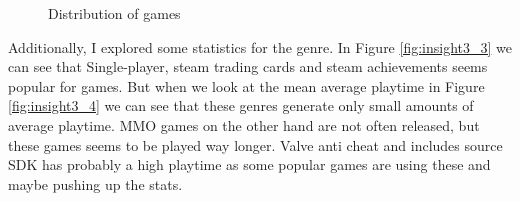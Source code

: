 \documentclass[11pt]{article}
\begin{document}
\begin{figure}[h]
\begin{subfigure}[b]{0.45\columnwidth}
        \label{fig:insight3_2}
    \end{subfigure}
    
    \caption{Distribution of games}
    \label{fig:insight3_distro_plat} 
  \end{figure}

  Additionally, I explored some statistics for the genre. In Figure \ref{fig:insight3_3} we can see that Single-player, steam trading cards and steam achievements seems popular for games. But when we look at the mean average playtime in Figure \ref{fig:insight3_4} we can see that these genres generate only small amounts of average playtime. MMO games on the other hand are not often released, but these games seems to be played way longer. 
  Valve anti cheat and includes source SDK has probably a high playtime as some popular games are using these and maybe pushing up the stats. 
\end{document}

